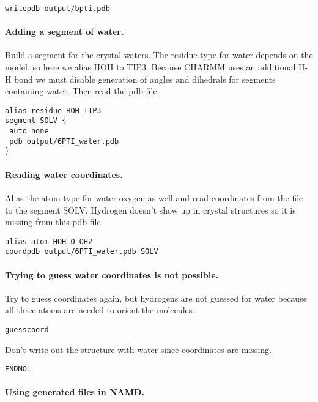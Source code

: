 \begin{verbatim}
writepdb output/bpti.pdb
\end{verbatim}

\paragraph*{Adding a segment of water.}


Build a segment for the crystal waters.  The residue type for water
depends on the model, so here we alias HOH to TIP3.  Because CHARMM
uses an additional H-H bond we must disable generation of angles and
dihedrals for segments containing water.  Then read the pdb file.

\begin{verbatim}
alias residue HOH TIP3
segment SOLV {
 auto none
 pdb output/6PTI_water.pdb
}
\end{verbatim}

\paragraph*{Reading water coordinates.}


Alias the atom type for water oxygen as well and read coordinates from
the file to the segment SOLV.  Hydrogen doesn't show up in crystal
structures so it is missing from this pdb file.

\begin{verbatim}
alias atom HOH O OH2
coordpdb output/6PTI_water.pdb SOLV
\end{verbatim}

\paragraph*{Trying to guess water coordinates is not possible.}


Try to guess coordinates again, but hydrogens are not guessed for water
because all three atoms are needed to orient the molecules.

\begin{verbatim}
guesscoord
\end{verbatim}


Don't write out the structure with water since coordinates are missing.

\begin{verbatim}
ENDMOL
\end{verbatim}

\paragraph*{Using generated files in NAMD.}

